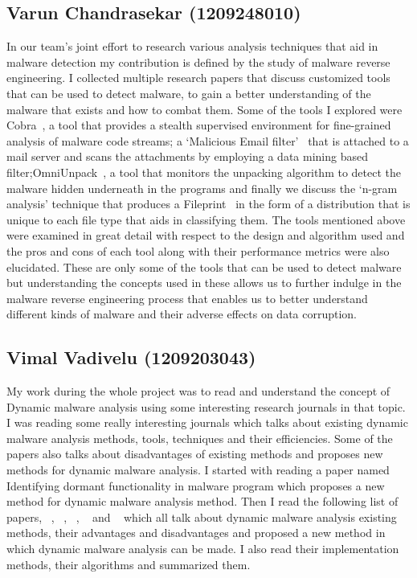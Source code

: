 \documentclass[11pt]{article}
\begin{document}
\subsection{Varun Chandrasekar (1209248010)}
In our team's joint effort to research various analysis techniques that aid in malware detection my contribution is defined by the study of malware reverse engineering. I collected multiple research papers that discuss customized tools that can be used to detect malware, to gain a better understanding of the malware that exists and how to combat them. Some of the tools I explored were Cobra~\cite{vasudevan2006cobra}, a tool that provides a stealth supervised environment for fine-grained analysis of malware code streams; a ‘Malicious Email filter’~\cite{schultz2001mef} that is attached to a mail server and scans the attachments by employing a data mining based filter;OmniUnpack~\cite{martignoni2007omniunpack}, a tool that monitors the unpacking algorithm to detect the malware hidden underneath in the programs and finally we discuss the ‘n-gram analysis’ technique that produces a Fileprint~\cite{li2005fileprints} in the form of a distribution that is unique to each file type that aids in classifying them.
The tools mentioned above were examined in great detail with respect to the design and algorithm used and the pros and cons of each tool along with their performance metrics were also elucidated. These are only some of the tools that can be used to detect malware but understanding the concepts used in these allows us to further indulge in the malware reverse engineering process that enables us to better understand different kinds of malware and their adverse effects on data corruption.
 

\subsection{Vimal Vadivelu (1209203043)}
My work during the whole project was to read and understand the concept of Dynamic malware analysis using some interesting research journals in that topic. I was reading some really interesting journals which talks about existing dynamic malware analysis methods, tools, techniques and their efficiencies. Some of the papers also talks about disadvantages of existing methods and proposes new methods for dynamic malware analysis. I started with reading a paper named Identifying dormant functionality in malware program which proposes a new method for dynamic malware analysis method. Then I read the following list of papers, ~\cite{irolla2016glassbox}, ~\cite{ki2015novel}, ~\cite{jerlin2015dynamic}, ~\cite{prayudi2015implementation} and ~\cite{massicotte2012testing} which all talk about dynamic malware analysis existing methods, their advantages and disadvantages and proposed a new method in which dynamic malware analysis can be made. I also read their implementation methods, their algorithms and summarized them. 
\end{document}
